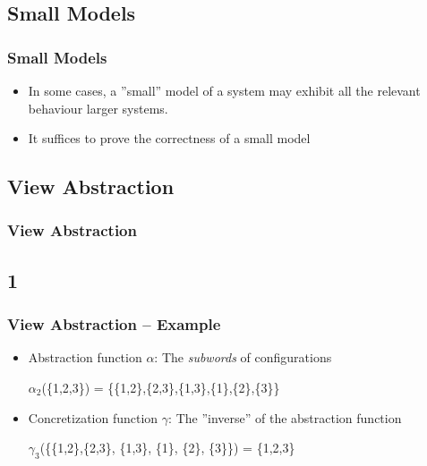 \documentclass[handout]{beamer}
\begin{document}
\subsection{Small Models}
\begin{frame}
  \frametitle{Small Models}
  \begin{itemize}
  \item
    In some cases, a ''small'' model of a system may exhibit all the relevant behaviour larger systems. %
  \item
    It suffices to prove the correctness of a small model
  \end{itemize}
\end{frame}

\subsection{View Abstraction}
\begin{frame}
  \frametitle{View Abstraction} %
  \begin{exampleblock}{}
    \abstraction
  \end{exampleblock}
\end{frame}

\subsection*{1}
\begin{frame}
\frametitle{View Abstraction -- Example}
\begin{itemize}
\item
Abstraction function $\alpha$: The \emph{subwords} of configurations
\begin{example}[Abstraction]
  $\alpha_2$(\{1,2,3\}) = \{\{1,2\},\{2,3\},\{1,3\},\{1\},\{2\},\{3\}\}
\end{example}
\item
Concretization function $\gamma$: The ''inverse'' of the abstraction function
\begin{example}[Concretization]
  $\gamma_3$(\{\{1,2\},\{2,3\}, \{1,3\}, \{1\}, \{2\}, \{3\}\}) = \{1,2,3\}
\end{example}
\end{itemize}
\end{frame}
\end{document}
